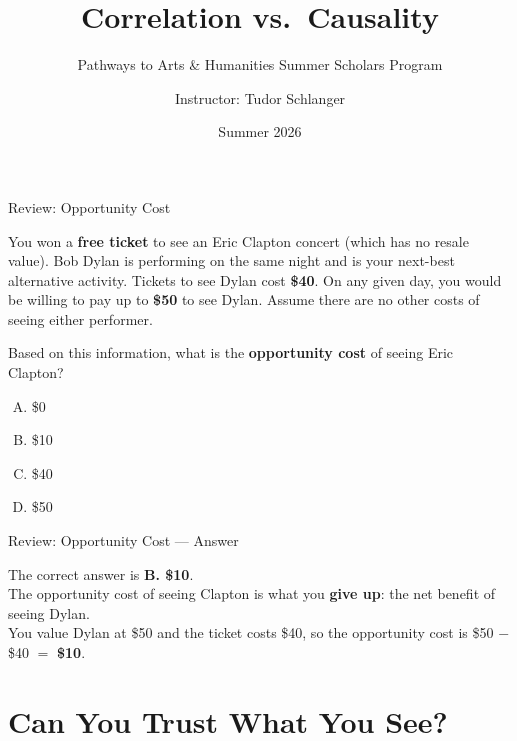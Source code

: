 \documentclass[9pt,english,aspectratio=169]{beamer}
\title{\textbf{Correlation vs.\ Causality}}
\subtitle{Pathways to Arts \& Humanities Summer Scholars Program}
\author{Instructor: Tudor Schlanger}
\date{Summer 2026}
\begin{document}
\begin{frame}
  \titlepage
\end{frame}

\begin{frame}{Review: Opportunity Cost}

  \begin{questionbox}
    You won a \textbf{free ticket} to see an Eric Clapton concert (which has no
    resale value). Bob Dylan is performing on the same night and is your
    next-best alternative activity. Tickets to see Dylan cost \textbf{\$40}. On
    any given day, you would be willing to pay up to \textbf{\$50} to see Dylan.
    Assume there are no other costs of seeing either performer.

    \vspace{0.5em}
    Based on this information, what is the \textbf{opportunity cost} of seeing
    Eric Clapton?
  \end{questionbox}

  \vspace{0.6em}
  \begin{enumerate}[A.]
    \item \$0
    \item \$10
    \item \$40
    \item \$50
  \end{enumerate}

\end{frame}

\begin{frame}{Review: Opportunity Cost --- Answer}

  \begin{answerbox}
    The correct answer is \textbf{B. \$10}.\\[0.5em]
    The opportunity cost of seeing Clapton is what you \textbf{give up}: the net benefit of seeing Dylan.\\[0.3em]
    You value Dylan at \$50 and the ticket costs \$40, so the opportunity cost is \$50 $-$ \$40 $=$ \textbf{\$10}.
  \end{answerbox}

\end{frame}

\section{Can You Trust What You See?}
\end{document}
